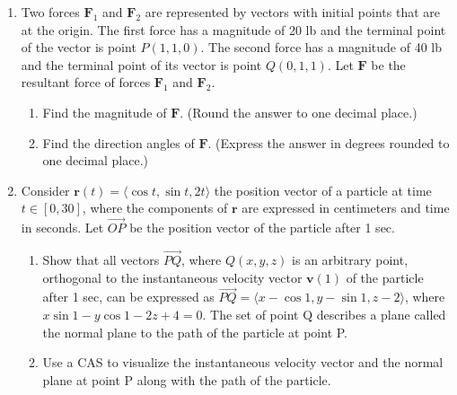 \documentclass{exercises}
\begin{document}
\begin{enumerate}[resume]
\item \techrequired Two forces $\mathbf{F}_{1}$ and $\mathbf{F}_{2}$ are represented by vectors with initial points that are at the origin. The first force has a magnitude of 20 lb and the terminal point of the vector is point $P(1,1,0)$. The second force has a magnitude of 40 lb and the terminal point of its vector is point $Q(0,1,1)$. Let $\mathbf{F}$ be the resultant force of forces $\mathbf{F}_{1}$ and $\mathbf{F}_{2}$.
\begin{enumerate}[label=(\alph*)]
  \item Find the magnitude of $\mathbf{F}$. (Round the answer to one decimal place.)
  \item Find the direction angles of $\mathbf{F}$. (Express the answer in degrees rounded to one decimal place.)
\end{enumerate}
\item \techrequired Consider $\mathbf{r}(t)=\langle \cos t,\sin t,2t\rangle$ the position vector of a particle at time $t\in[0,30]$, where the components of $\mathbf{r}$ are expressed in centimeters and time in seconds. Let $\overset{\to}{OP}$ be the position vector of the particle after 1 sec.
\begin{enumerate}[label=(\alph*)]
  \item Show that all vectors $\overset{\to}{PQ}$, where $Q(x,y,z)$ is an arbitrary point, orthogonal to the instantaneous velocity vector $\mathbf{v}(1)$ of the particle after 1 sec, can be expressed as $\overset{\to}{PQ}=\langle x-\cos 1,y-\sin 1,z-2\rangle$, where $x\sin 1-y\cos 1-2z+4=0$. The set of point Q describes a plane called the normal plane to the path of the particle at point P.
  \item Use a CAS to visualize the instantaneous velocity vector and the normal plane at point P along with the path of the particle.
\end{enumerate}
\end{enumerate}
\end{document}
